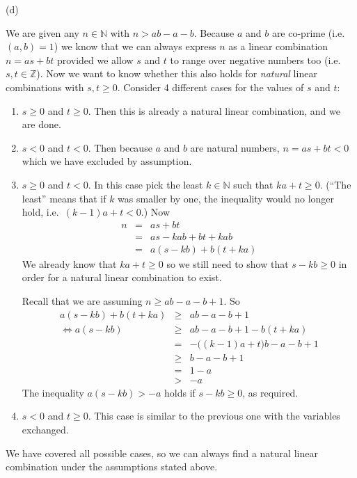 \documentclass{article}
\begin{document}
(d)

We are given any $n \in \mathbb{N}$ with $n > ab-a-b$. Because $a$ and $b$ are
co-prime (i.e.\ $(a,b)=1$) we know that we can always express $n$ as a linear
combination $n=as+bt$ provided we allow $s$ and $t$ to range over negative
numbers too (i.e.\ $s,t \in \mathbb{Z}$). Now we want to know whether this
also holds for \emph{natural} linear combinations with $s,t \ge 0$.
Consider 4 different cases for the values of $s$ and $t$:
\begin{enumerate}
\item $s \ge 0$ and $t \ge 0$. Then this is already a natural linear combination,
and we are done.

\item $s < 0$ and $t < 0$. Then because $a$ and $b$ are natural numbers,
$n=as+bt<0$ which we have excluded by assumption.

\item $s \ge 0$ and $t < 0$. In this case pick the least $k \in \mathbb{N}$
such that $ka+t \ge 0$. (``The least'' means that if $k$ was smaller by one,
the inequality would no longer hold, i.e.\ $(k-1)a+t<0$.) Now
\begin{eqnarray*}
n &=& as + bt\\
&=& as - kab + bt + kab\\
&=& a(s-kb) + b(t+ka)
\end{eqnarray*}
We already know that $ka+t \ge 0$ so we still need to show that $s-kb \ge 0$ in
order for a natural linear combination to exist.

Recall that we are assuming $n \ge ab-a-b+1$. So
\begin{eqnarray*}
a(s-kb) + b(t+ka) &\ge& ab-a-b+1 \\
\iff a(s-kb) &\ge& ab-a-b+1-b(t+ka) \\
&=& -\big((k-1)a+t\big)b - a - b + 1 \\
&\ge& b - a - b + 1 \\
&=& 1 - a \\
&>& -a
\end{eqnarray*}
The inequality $a(s-kb) > -a$ holds if $s-kb \ge 0$, as required.

\item $s < 0$ and $t \ge 0$. This case is similar to the previous one with the
variables exchanged.
\end{enumerate}
We have covered all possible cases, so we can always find a natural linear
combination under the assumptions stated above.
\end{document}
